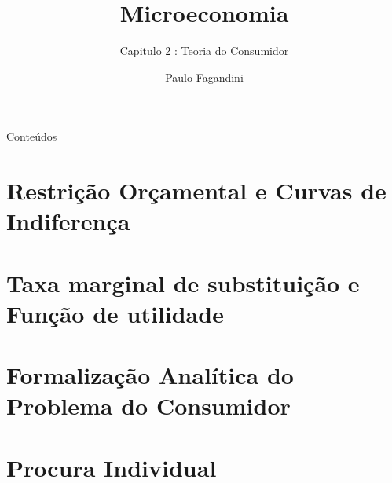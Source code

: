 \documentclass[table]{beamer}
\title{Microeconomia}
\subtitle{Capitulo 2 : Teoria do Consumidor}
\author[P. Fagandini]{Paulo Fagandini}
\institute[ISCAL]{\texttt{[image: ../visual material/logo\_eng\_full.png]}}
\date{}
\begin{document}
{
\begin{frame}
	\maketitle
\end{frame}
}

\begin{frame}{Conte\'udos}
  \tableofcontents
\end{frame}

\section{Restri\c c\~ao Or\c camental e Curvas de Indiferen\c ca}

\section{Taxa marginal de substitui\c c\~ao e Fun\c c\~ao de utilidade}

\section{Formaliza\c c\~ao Anal\'itica do Problema do Consumidor}

\section{Procura Individual}


\end{document}
